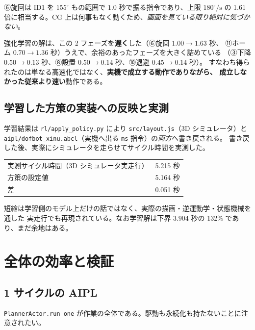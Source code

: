 \documentclass[11pt,a4paper]{article}
\begin{document}
\noindent
⑥旋回は ID1 を $155^\circ$ もの範囲で $1.0$ 秒で振る指令であり、上限 $180^\circ/\mathrm{s}$ の
1.61 倍に相当する。CG 上は何事もなく動くため、\emph{画面を見ている限り絶対に気づかない}。

強化学習の解は、この 2 フェーズを\textbf{遅く}した（⑥旋回 $1.00 \to 1.63$ 秒、
⑪ホーム $0.70 \to 1.36$ 秒）うえで、余裕のあったフェーズを大きく詰めている
（③下降 $0.50 \to 0.13$ 秒、⑧設置 $0.50 \to 0.14$ 秒、⑩退避 $0.45 \to 0.14$ 秒）。
すなわち得られたのは単なる高速化ではなく、\textbf{実機で成立する動作でありながら、
成立しなかった従来より速い}動作である。

\subsection{学習した方策の実装への反映と実測}
学習結果は \texttt{rl/apply\_policy.py} により \texttt{src/layout.js}（3D シミュレータ）と
\texttt{aipl/dofbot\_xinu.abcl}（実機へ出る \texttt{ms} 指令）の\emph{両方}へ書き戻される。
書き戻した後、実際にシミュレータを走らせてサイクル時間を実測した。

\begin{center}
\small
\begin{tabular}{@{}lr@{}}
\toprule
実測サイクル時間（3D シミュレータ実走行） & 5.215 秒 \\
方策の設定値 & 5.164 秒 \\
差 & 0.051 秒 \\
\bottomrule
\end{tabular}
\end{center}

\noindent
短縮は学習側のモデル上だけの話ではなく、実際の描画・逆運動学・状態機械を通した
実走行でも再現されている。なお学習解は下界 $3.904$ 秒の 132\% であり、まだ余地はある。

\section{全体の効率と検証}

\subsection{1 サイクルの AIPL}
\texttt{PlannerActor.run\_one} が作業の全体である。駆動も永続化も持たないことに注意されたい。
\end{document}
